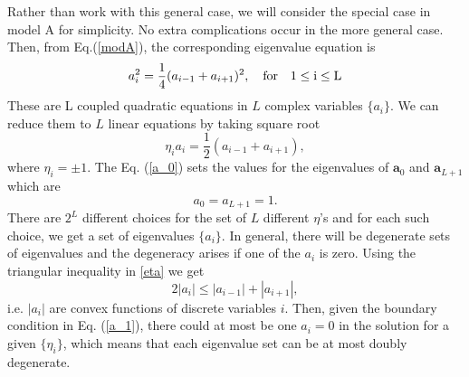 \documentclass[11pt,a4paper]{book}
\begin{document}
Rather than work with this general case, we will consider the special
case in model A for simplicity. No extra complications occur in
the more general case. Then, from Eq.(\ref{modA}), the corresponding
eigenvalue equation is
\begin{equation}
  a_i^2 = \frac{1}{4}(a_{i-1}+a_{i+1})^2 \rm{,~ ~ ~ for ~ } \rm{~ }\rm{~}1 \le i \le L 
  \label{eveqn}
\end{equation}
These are L coupled quadratic equations in $L$ complex variables $\{a_i\}$.
We can reduce them to $L$ linear equations by taking square root
\begin{equation}
  \eta_ia_i=\frac{1}{2}(a_{i-1}+a_{i+1}),
  \label{eta}
\end{equation}
where $\eta_i=\pm1$. The Eq. (\ref{a_0}) sets the values for the 
eigenvalues of $\mathbf{a}_0$ and $\mathbf{a}_{L+1}$ which are 
\begin{equation}
  a_0=a_{L+1}=1.
  \label{a_1}
\end{equation}
There are $2^L$ different choices for the set of $L$
different $\eta$'s and for each such choice, we get a set of
eigenvalues $\{a_i\}$. In general, there will be
degenerate sets of eigenvalues and the degeneracy arises
if one of the $a_i$ is zero. Using the triangular inequality in \eqref{eta}
we get
\begin{equation}
  2|a_i|\le|a_{i-1}|+|a_{i+1}|,
\end{equation}
i.e. $|a_i|$ are convex functions of discrete variables $i$. Then,
given the boundary condition in Eq. (\ref{a_1}), there could
at most be one $a_i=0$ in the solution for a given $\{\eta_i\}$,
which means that each eigenvalue set can be at most doubly degenerate.
\end{document}
